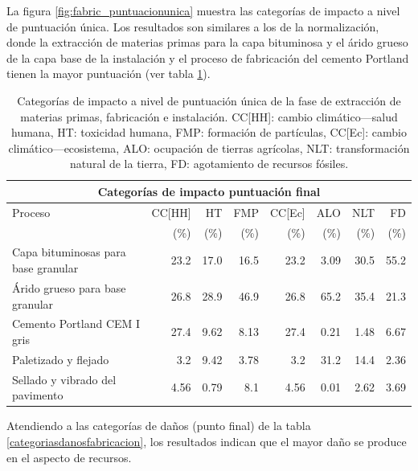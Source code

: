 La figura \ref{fig:fabric_puntuacionunica} muestra las categorías de impacto a nivel de puntuación única. Los resultados son similares a los de la normalización, donde la extracción de materias primas para la capa bituminosa y el árido grueso de la capa base de la instalación y el proceso de fabricación del cemento Portland tienen la mayor puntuación (ver tabla \ref{categoriasimpactofabricacionpuntunica}).

\begin{table}[!htb]
\centering
\begin{tabular}{p{4cm}rrrrrrr}
\toprule
\multicolumn{8}{c}{Categorías de impacto puntuación final}\\
\midrule
Proceso & CC[HH] & HT & FMP & CC[Ec] & ALO & NLT & FD\\
 &  (\%) & (\%) & (\%) & (\%) & (\%) & (\%) & (\%)\\
\midrule
Capa bituminosas para base granular & 23.2 & 17.0 & 16.5 & 23.2 & 3.09 & 30.5 & 55.2\\
Árido grueso para base granular & 26.8 & 28.9 & 46.9 & 26.8 & 65.2 & 35.4 & 21.3\\
Cemento Portland CEM I gris & 27.4 & 9.62 & 8.13 & 27.4 & 0.21 & 1.48 & 6.67\\
Paletizado y flejado & 3.2 & 9.42 & 3.78 & 3.2 & 31.2 & 14.4 & 2.36\\
Sellado y vibrado del pavimento & 4.56 & 0.79 & 8.1 & 4.56 & 0.01 & 2.62 & 3.69\\
\bottomrule
\end{tabular}
\caption[Categorías de impacto a nivel de puntuación única de la fase de extracción de materias primas, fabricación e instalación.]{Categorías de impacto a nivel de puntuación única de la fase de extracción de materias primas, fabricación e instalación. CC[HH]: cambio climático—salud humana, HT: toxicidad humana, FMP: formación de partículas, CC[Ec]: cambio climático—ecosistema, ALO: ocupación de tierras agrícolas, NLT: transformación natural de la tierra, FD: agotamiento de recursos fósiles.}
\label{categoriasimpactofabricacionpuntunica}
\end{table}

Atendiendo a las categorías de daños (punto final) de la tabla \ref{categoriasdanosfabricacion}, los resultados indican que el mayor daño se produce en el aspecto de recursos.

